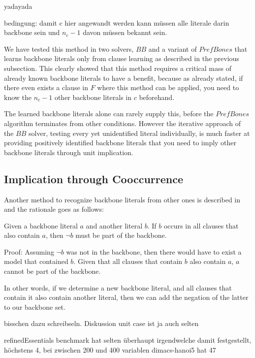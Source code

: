 yadayada

bedingung: damit c hier angewandt werden kann müssen alle literale darin backbone sein und $n_c - 1$ davon müssen bekannt sein.


We have tested this method in two solvers, $BB$ and a variant of $PrefBones$ that learns backbone literals only from clause learning as described in the previous subsection. This clearly showed that this method requires a critical mass of already known backbone literals to have a benefit, because as already stated, if there even exists a clause in $F$ where this method can be applied, you need to know the $n_c - 1$ other backbone literals in $c$ beforehand.

The learned backbone literals alone can rarely supply this, before the $PrefBones$ algorithm terminates from other conditions. However the iterative approach of the $BB$ solver, testing every yet unidentified literal individually, is much faster at providing positively identified backbone literals that you need to imply other backbone literals through unit implication.

\subsection{Implication through Cooccurrence}
\label{subsec:coocc}

Another method to recognize backbone literals from other ones is described in \cite{wbxcl16} and the rationale goes as follows:
\begin{lemma}
Given a backbone literal $a$ and another literal $b$. If $b$ occurs in all clauses that also contain $a$, then $\neg b$ must be part of the backbone. 

Proof: Assuming $\neg b$ was not in the backbone, then there would have to exist a model that contained $b$. Given that all clauses that contain $b$ also contain $a$, $a$ cannot be part of the backbone.
\end{lemma}

In other words, if we determine a new backbone literal, and all clauses that contain it also contain another literal, then we can add the negation of the latter to our backbone set. 

bisschen dazu schreibseln. Diskussion unit case ist ja auch selten

refinedEssentials benchmark hat selten überhaupt irgendwelche damit festgestellt, höchstens 4, bei zwischen 200 und 400 variablen
dimacs-hanoi5 hat 47

